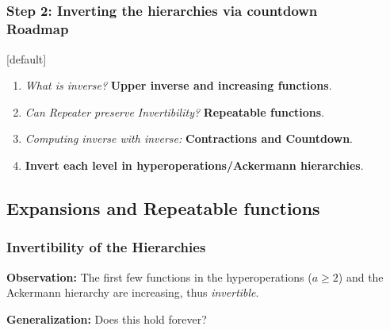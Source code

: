 \subsection*{}
\begin{frame}
\frametitle{Step 2: Inverting the hierarchies via countdown\\ Roadmap}
[default]

\begin{enumerate}[\bfseries 1.]
	\itemsep 3ex
	\item<done@1->
	\emph{What is inverse?} \textbf{Upper inverse and increasing functions}.
	
	\item<come@2->
	\emph{Can Repeater preserve Invertibility?} \textbf{Repeatable functions}.
	
	\item
	\emph{Computing inverse with inverse:} \textbf{Contractions and Countdown}.
	
	\item
	\textbf{Invert each level in hyperoperations/Ackermann hierarchies}.
\end{enumerate}
\end{frame}


\subsection{Expansions and Repeatable functions}

\begin{frame}
\frametitle{Invertibility of the Hierarchies}

\textbf{Observation:} The first few functions in the hyperoperations ($a\ge 2$) and the Ackermann hierarchy are increasing, thus \emph{invertible}.

\bigskip

\textbf{Generalization:} Does this hold forever?

\bigskip


%
%
\end{frame}


